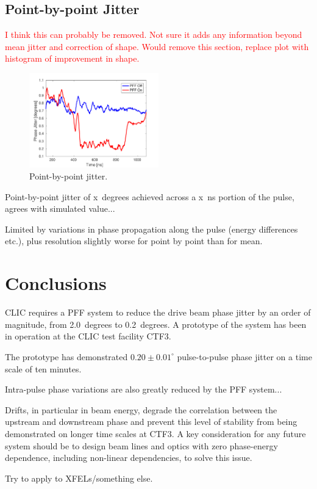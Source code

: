 \documentclass[%
 reprint,
 amsmath,amssymb,
 aps,
]{revtex4-1}
\begin{document}
\subsection{\label{ss:pbpJit}Point-by-point Jitter}

\textcolor{red}{I think this can probably be removed. Not sure it adds any 
information beyond mean jitter and correction of shape. Would remove this 
section, replace plot with histogram of improvement in shape.}

\begin{figure}
\includegraphics[width=0.5\textwidth]{figs/BestFF_pbp}%
\caption{\label{fig:BestFF_pbp}Point-by-point jitter.}
\end{figure}


Point-by-point jitter of x~degrees achieved across a x~ns portion of the pulse, agrees with simulated value...

Limited by variations in phase propagation along the pulse (energy differences etc.), plus resolution slightly worse for point by point than for mean.



\section{\label{s:conc}Conclusions}

CLIC requires a PFF system to reduce the drive beam phase jitter by an order of 
magnitude, from 2.0~degrees to 0.2~degrees. A prototype of the system has been 
in operation at the CLIC test facility CTF3.

The prototype has demonstrated \(0.20\pm0.01^\circ\) pulse-to-pulse 
phase jitter on a time scale of ten minutes. 

Intra-pulse phase variations are also greatly reduced by the PFF system...

Drifts, in particular in beam energy, degrade the correlation between the 
upstream and downstream phase and prevent this level of stability from being 
demonstrated on longer time scales at CTF3. A key consideration for any future 
system should be to design beam lines and optics with zero phase-energy 
dependence, including non-linear dependencies, to solve this issue.

Try to apply to XFELs/something else.

\end{document}
